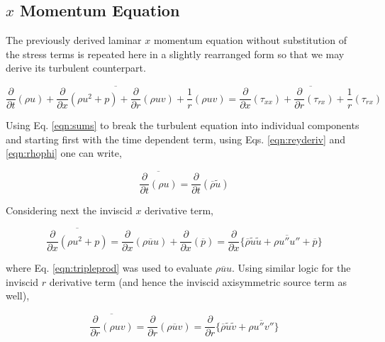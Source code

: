 \subsection{$x$ Momentum Equation}

	The previously derived laminar $x$ momentum equation without substitution of the stress terms is repeated here
in a slightly rearranged form so that we may derive its turbulent counterpart.

\begin{equation}
\overline{\frac{\partial}{\partial t}(\rho u) + \frac{\partial}{\partial x}(\rho u^2 + p) +
\frac{\partial}{\partial r}(\rho uv) + \frac{1}{r}(\rho u v)} = \overline{ 
\frac{\partial}{\partial x}(\tau_{xx}) + \frac{\partial}{\partial r}(\tau_{rx}) + \frac{1}{r}(\tau_{rx})}
\label{eqn:xmomshear2}
\end{equation}

	Using Eq. \ref{eqn:sums} to break the turbulent equation into individual components and
starting first with the time dependent term, using Eqs. \ref{eqn:reyderiv} and \ref{eqn:rhophi} 
one can write,

\begin{displaymath}
	\overline{\frac{\partial}{\partial t}(\rho u)} = \frac{\partial}{\partial t}(\overline{\rho}\tilde{u})
\end{displaymath}

	Considering next the inviscid $x$ derivative term,

\begin{displaymath}
	\overline{\frac{\partial}{\partial x}(\rho u^2 + p)} = \frac{\partial}{\partial x}(\overline{\rho u u}) + 
	\frac{\partial}{\partial x}(\overline{p}) = \frac{\partial}{\partial x}\Big\{\overline{\rho}\tilde{u}\tilde{u} +
	\overline{\rho u'' u''} + \overline{p}\Big\}
\end{displaymath}

	where Eq. \ref{eqn:tripleprod} was used to evaluate $\overline{\rho u u}$.  Using similar logic for 
the inviscid $r$ derivative term (and hence the inviscid axisymmetric source term as well),

\begin{displaymath}
	\overline{\frac{\partial}{\partial r}(\rho uv)} = \frac{\partial}{\partial r}(\overline{\rho u v}) 
	= \frac{\partial}{\partial r}\Big\{\overline{\rho}\tilde{u}\tilde{v} +
	\overline{\rho u'' v''}\Big\}
\end{displaymath}

